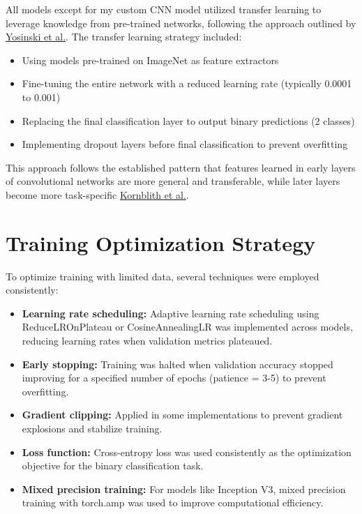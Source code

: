 \documentclass[a4paper,12pt]{article}
\begin{document}
All models except for my custom CNN model utilized transfer learning to leverage knowledge from pre-trained networks, following the approach outlined by \href{https://arxiv.org/abs/1411.1792}{Yosinski et al.}. The transfer learning strategy included:

\begin{itemize}
    \item Using models pre-trained on ImageNet as feature extractors
    \item Fine-tuning the entire network with a reduced learning rate (typically 0.0001 to 0.001)
    \item Replacing the final classification layer to output binary predictions (2 classes)
    \item Implementing dropout layers before final classification to prevent overfitting
\end{itemize}

This approach follows the established pattern that features learned in early layers of convolutional networks are more general and transferable, while later layers become more task-specific \href{https://arxiv.org/abs/1606.04446}{Kornblith et al.}.

\section{Training Optimization Strategy}

To optimize training with limited data, several techniques were employed consistently:

\begin{itemize}
    \item \textbf{Learning rate scheduling:} Adaptive learning rate scheduling using ReduceLROnPlateau or CosineAnnealingLR was implemented across models, reducing learning rates when validation metrics plateaued.
    \item \textbf{Early stopping:} Training was halted when validation accuracy stopped improving for a specified number of epochs (patience = 3-5) to prevent overfitting.
    \item \textbf{Gradient clipping:} Applied in some implementations to prevent gradient explosions and stabilize training.
    \item \textbf{Loss function:} Cross-entropy loss was used consistently as the optimization objective for the binary classification task.
    \item \textbf{Mixed precision training:} For models like Inception V3, mixed precision training with torch.amp was used to improve computational efficiency.
\end{itemize}
\end{document}
